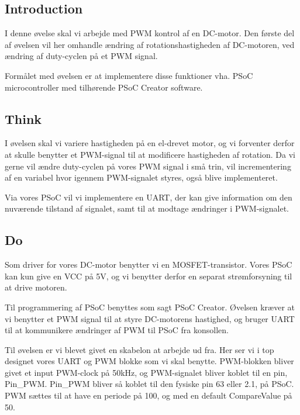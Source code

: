 \documentclass[../main.tex]{subfiles}
\begin{document}
\subsection{Introduction}
I denne øvelse skal vi arbejde med PWM kontrol af en DC-motor. Den første del af øvelsen vil her omhandle ændring af rotationshastigheden af DC-motoren, ved ændring af duty-cyclen på et PWM signal.

Formålet med øvelsen er at implementere disse funktioner vha. PSoC microcontroller med tilhørende PSoC Creator software. 

\subsection{Think}
I øvelsen skal vi variere hastigheden på en el-drevet motor, og vi forventer derfor at skulle benytter et PWM-signal til at modificere hastigheden af rotation. Da vi gerne vil ændre duty-cyclen på vores PWM signal i små trin, vil incrementering af en variabel hvor igennem PWM-signalet styres, også blive implementeret.

Via vores PSoC vil vi implementere en UART, der kan give information om den nuværende tilstand af signalet, samt til at modtage ændringer i PWM-signalet.

\subsection{Do}
Som driver for vores DC-motor benytter vi en MOSFET-transistor. Vores PSoC kan kun give en VCC på 5V, og vi benytter derfor en separat strømforsyning til at drive motoren.


Til programmering af PSoC benyttes som sagt PSoC Creator. Øvelsen kræver at vi benytter et PWM signal til at styre DC-motorens hastighed, og bruger UART til at kommunikere ændringer af PWM til PSoC fra konsollen.

Til øvelsen er vi blevet givet en skabelon at arbejde ud fra. Her ser vi i top designet vores UART og PWM blokke som vi skal benytte. PWM-blokken bliver givet et input PWM-clock på 50kHz, og PWM-signalet bliver koblet til en pin, Pin\_PWM. Pin\_PWM bliver så koblet til den fysiske pin 63 eller 2.1, på PSoC. PWM sættes til at have en periode på 100, og med en default CompareValue på 50.

\end{document}
